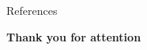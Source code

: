 \documentclass{beamer}
\begin{document}
\appendix



\begin{frame}[allowframebreaks]{References}
	\nocite{*} %
    
	 
\end{frame}


\begin{frame}[focus]
  \textbf{Thank you for attention}
\end{frame}

\end{document}
